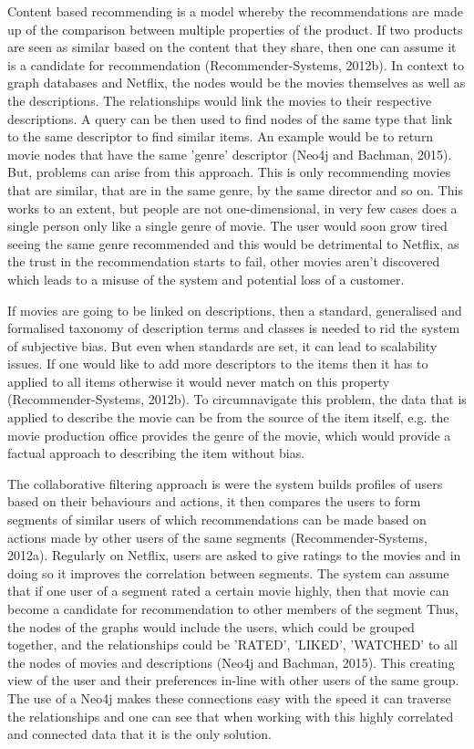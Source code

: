 \documentclass[a4paper]{article}
\begin{document}
Content based recommending is a model whereby the recommendations are made up of the comparison between multiple properties of the product. If two products are seen as similar based on the content that they share, then one can assume it is a candidate for recommendation (Recommender-Systems, 2012b). In context to graph databases and Netflix, the nodes would be the movies themselves as well as the descriptions. The relationships would link the movies to their respective descriptions. A query can be then used to find nodes of the same type that link to the same descriptor to find similar items. An example would be to return movie nodes that have the same 'genre' descriptor (Neo4j and Bachman, 2015). But, problems can arise from this approach. This is only recommending movies that are similar, that are in the same genre, by the same director and so on. This works to an extent, but people are not one-dimensional, in very few cases does a single person only like a single genre of movie. The user would soon grow tired seeing the same genre recommended and this would be detrimental to Netflix, as the trust in the recommendation starts to fail, other movies aren't discovered which leads to a misuse of the system and potential loss of a customer. \par

If movies are going to be linked on descriptions, then a standard, generalised and formalised taxonomy of description terms and classes is needed to rid the system of subjective bias. But even when standards are set, it can lead to scalability issues. If one would like to add more descriptors to the items then it has to applied to all items otherwise it would never match on this property (Recommender-Systems, 2012b). To circumnavigate this problem, the data that is applied to describe the movie can be from the source of the item itself, e.g. the movie production office provides the genre of the movie, which would provide a factual approach to describing the item without bias.

The collaborative filtering approach is were the system builds profiles of users based on their behaviours and actions, it then compares the users to form segments of similar users of which recommendations can be made based on actions made by other users of the same segments (Recommender-Systems, 2012a). Regularly on Netflix, users are asked to give ratings to the movies and in doing so it improves the correlation between segments. The system can assume that if one user of a segment rated a certain movie highly, then that movie can become a candidate for recommendation to other members of the segment Thus, the nodes of the graphs would include the users, which could be grouped together, and the relationships could be 'RATED', 'LIKED', 'WATCHED' to all the nodes of movies and descriptions (Neo4j and Bachman, 2015). This creating view of the user and their preferences in-line with other users of the same group. The use of a Neo4j makes these connections easy with the speed it can traverse the relationships and one can see that when working with this highly correlated and connected data that it is the only solution. \par
\end{document}
